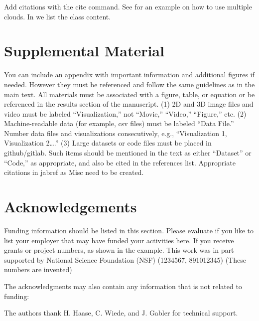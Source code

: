 \documentclass[9pt,twocolumn,twoside]{styles/osajnl}
\begin{document}
\noindent Add citations with the cite command. See
\cite{las14cloudmeshmultiple} for an example on how to use multiple
clouds. In \cite{www-i524} we list the class content.

\section{Supplemental Material}

You can include an appendix with important information and additional
figures if needed. However they must be referenced and follow the same
guidelines as in the main text.  All materials must be associated with
a figure, table, or equation or be referenced in the results section
of the manuscript.  (1) 2D and 3D image files and video must be
labeled “Visualization,” not “Movie,” “Video,” “Figure,” etc.  (2)
Machine-readable data (for example, csv files) must be labeled “Data
File.”  Number data files and visualizations consecutively, e.g.,
“Visualization 1, Visualization 2….”  (3) Large datasets or code files
must be placed in github/gitlab.  Such items should be mentioned in
the text as either “Dataset” or “Code,” as appropriate, and also be
cited in the references list. Appropriate citations in jabref as Misc
need to be created.

\section*{Acknowledgements}

Funding information should be listed in this section. Please evaluate
if you like to list your employer that may have funded your activities
here.  If you receive grants or project numbers, as shown in the
example.  This work was in part supported by National Science
Foundation (NSF) (1234567, 891012345) (These numbers are invented)

The acknowledgments may also contain any information that is not
related to funding:

The authors thank H. Haase, C. Wiede, and J. Gabler for technical
support.




 
\end{document}
